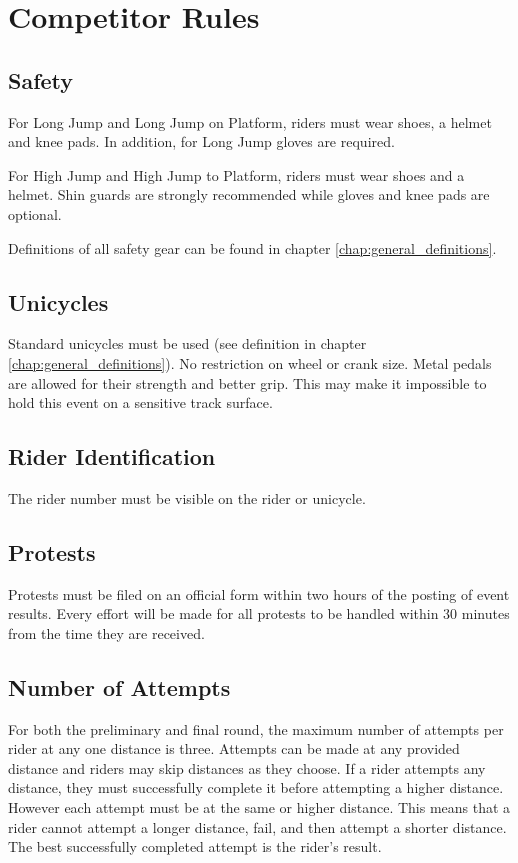 \chapter{Competitor Rules}

\section{Safety}

For Long Jump and Long Jump on Platform, riders must wear shoes, a helmet and knee pads.
In addition, for Long Jump gloves are required.

For High Jump and High Jump to Platform, riders must wear shoes and a helmet.
Shin guards are strongly recommended while gloves and knee pads are optional.

Definitions of all safety gear can be found in chapter \ref{chap:general_definitions}.

\section{Unicycles}

Standard unicycles must be used (see definition in chapter \ref{chap:general_definitions}).
No restriction on wheel or crank size.
Metal pedals are allowed for their strength and better grip.
This may make it impossible to hold this event on a sensitive track surface.

\section{Rider Identification}

The rider number must be visible on the rider or unicycle.

\section{Protests}

Protests must be filed on an official form within two hours of the posting of event results.
Every effort will be made for all protests to be handled within 30 minutes from the time they are received.

\section{Number of Attempts}
For both the preliminary and final round, the maximum number of attempts per rider at any one distance is three.
Attempts can be made at any provided distance and riders may skip distances as they choose.
If a rider attempts any distance, they must successfully complete it before attempting a higher distance.
However each attempt must be at the same or higher distance.
This means that a rider cannot attempt a longer distance, fail, and then attempt a shorter distance.
The best successfully completed attempt is the rider's result.


